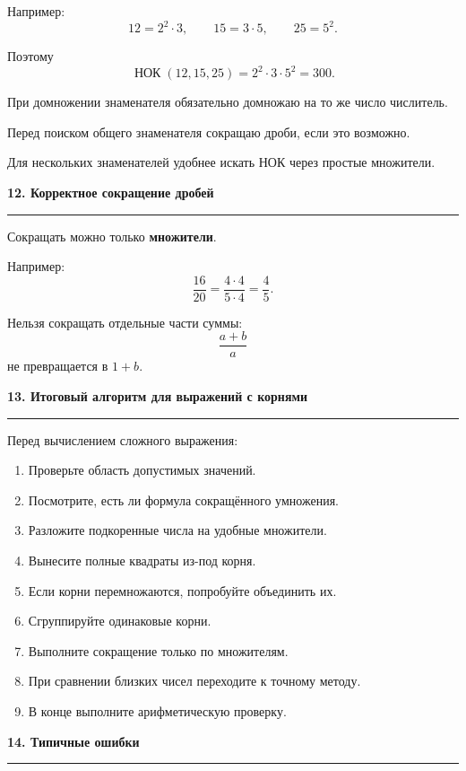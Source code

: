 \documentclass[a4paper,12pt]{article}
\newcommand{\topic}[1]{%
    \vspace{0.7em}
    {\large\bfseries\color{darkaccent}#1}\par
    \vspace{0.25em}
    {\color{rulegray}\hrule}
    \vspace{0.65em}
}
\newcommand{\important}[1]{{\bfseries\color{darkaccent}#1}}
\begin{document}
Например:
\[
12=2^2\cdot3,
\qquad
15=3\cdot5,
\qquad
25=5^2.
\]

Поэтому
\[
\operatorname{НОК}(12,15,25)=2^2\cdot3\cdot5^2=300.
\]

\begin{checklist}
    \item При домножении знаменателя обязательно домножаю на то же число числитель.
    \item Перед поиском общего знаменателя сокращаю дроби, если это возможно.
    \item Для нескольких знаменателей удобнее искать НОК через простые множители.
\end{checklist}

\topic{12. Корректное сокращение дробей}

Сокращать можно только \important{множители}.

Например:
\[
\frac{16}{20}=\frac{4\cdot4}{5\cdot4}=\frac45.
\]

Нельзя сокращать отдельные части суммы:
\[
\frac{a+b}{a}
\]
не превращается в \(1+b\).

\topic{13. Итоговый алгоритм для выражений с корнями}

Перед вычислением сложного выражения:
\begin{enumerate}
    \item Проверьте область допустимых значений.
    \item Посмотрите, есть ли формула сокращённого умножения.
    \item Разложите подкоренные числа на удобные множители.
    \item Вынесите полные квадраты из-под корня.
    \item Если корни перемножаются, попробуйте объединить их.
    \item Сгруппируйте одинаковые корни.
    \item Выполните сокращение только по множителям.
    \item При сравнении близких чисел переходите к точному методу.
    \item В конце выполните арифметическую проверку.
\end{enumerate}

\topic{14. Типичные ошибки}
\end{document}
